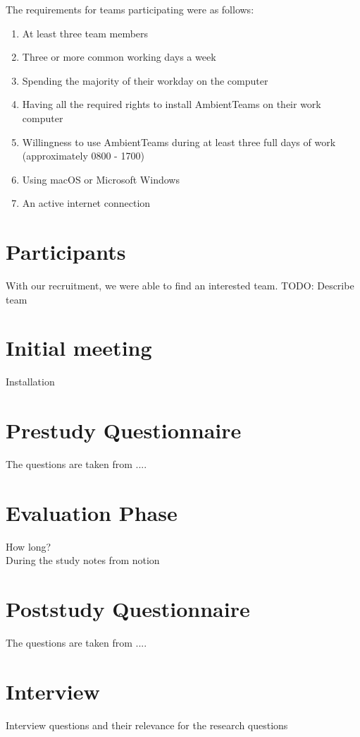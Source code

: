 The requirements for teams participating were as follows:

\begin{enumerate}
    \item At least three team members
    \item Three or more common working days a week
    \item Spending the majority of their workday on the computer
    \item Having all the required rights to install AmbientTeams on their work computer
    \item Willingness to use AmbientTeams during at least three full days of work (approximately 0800 - 1700)
    \item Using macOS or Microsoft Windows
    \item An active internet connection
\end{enumerate}

\section{Participants}
With our recruitment, we were able to find an interested team. TODO: Describe team

\section{Initial meeting}
\label{section:initial_meeting}
Installation

\section{Prestudy Questionnaire}
\label{section:prestudy_questionnaire}
The questions are taken from ....

\section{Evaluation Phase}
\label{section:evaluation}
How long? \\
During the study notes from notion

\section{Poststudy Questionnaire}
\label{section:poststudy_questionnaire}
The questions are taken from ....

\section{Interview}
\label{section:interview}
Interview questions and their relevance for the research questions
